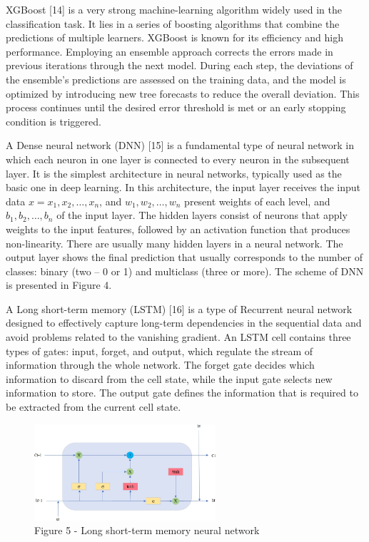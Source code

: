 \begin{multicols}{2}
XGBoost {[}14{]} is a very strong machine-learning algorithm widely used
in the classification task. It lies in a series of boosting algorithms
that combine the predictions of multiple learners. XGBoost is known for
its efficiency and high performance. Employing an ensemble approach
corrects the errors made in previous iterations through the next model.
During each step, the deviations of the ensemble's predictions are
assessed on the training data, and the model is optimized by introducing
new tree forecasts to reduce the overall deviation. This process
continues until the desired error threshold is met or an early stopping
condition is triggered.

A Dense neural network (DNN) {[}15{]} is a fundamental type of neural
network in which each neuron in one layer is connected to every neuron
in the subsequent layer. It is the simplest architecture in neural
networks, typically used as the basic one in deep learning. In this
architecture, the input layer receives the input data $x=x_1,x_2,\ldots,x_n$, and $w_1,w_2,\ldots,w_n$ present weights of each level, and $b_1,b_2,\ldots,b_n$
of the input layer. The hidden layers consist of neurons that apply
weights to the input features, followed by an activation function that
produces non-linearity. There are usually many hidden layers in a neural
network. The output layer shows the final prediction that usually
corresponds to the number of classes: binary (two -- 0 or 1) and
multiclass (three or more). The scheme of DNN is presented in Figure 4.

A Long short-term memory (LSTM) {[}16{]} is a type of Recurrent neural
network designed to effectively capture long-term dependencies in the
sequential data and avoid problems related to the vanishing gradient. An
LSTM cell contains three types of gates: input, forget, and output,
which regulate the stream of information through the whole network. The
forget gate decides which information to discard from the cell state,
while the input gate selects new information to store. The output gate
defines the information that is required to be extracted from the
current cell state.
\end{multicols}

\begin{figure}[H]
	\centering
	\includegraphics[width=0.6\textwidth]{media/ict/image63}
	\caption*{Figure 5 - Long short-term memory neural network}
\end{figure}

